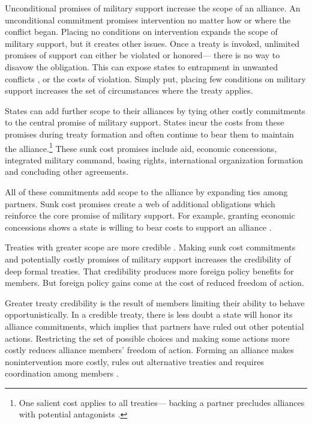 \documentclass[12pt]{article}
\begin{document}
Unconditional promises of military support increase the scope of an alliance. 
An unconditional commitment promises intervention no matter how or where the conflict began. 
Placing no conditions on intervention expands the scope of military support, but it creates other issues. 
Once a treaty is invoked, unlimited promises of support can either be violated or honored--- there is no way to disavow the obligation. 
This can expose states to entrapment in unwanted conflicts \citep{Snyder1990, Benson2012}, or the costs of violation. 
Simply put, placing few conditions on military support increases the set of circumstances where the treaty applies.  


States can add further scope to their alliances by tying other costly commitments to the central promise of military support. 
States incur the costs from these promises during treaty formation and often continue to bear them to maintain the alliance.\footnote{
One salient cost applies to all treaties--- backing a partner precludes alliances with potential antagonists \citep{Snyder1997}.} 
These sunk cost promises include aid, economic concessions, integrated military command, basing rights, international organization formation and concluding other agreements. 


All of these commitments add scope to the alliance by expanding ties among partners. 
Sunk cost promises create a web of additional obligations which reinforce the core promise of military support.  
For example, granting economic concessions shows a state is willing to bear costs to support an alliance \citep{WolfordKim2017}. 


Treaties with greater scope are more credible \citep{Poast2013}. 
Making sunk cost commitments and potentially costly promises of military support increases the credibility of deep formal treaties.
That credibility produces more foreign policy benefits for members. 
But foreign policy gains come at the cost of reduced freedom of action. 


Greater treaty credibility is the result of members limiting their ability to behave opportunistically. 
In a credible treaty, there is less doubt a state will honor its alliance commitments, which implies that partners have ruled out other potential actions. 
Restricting the set of possible choices and making some actions more costly reduces alliance members' freedom of action. 
Forming an alliance makes nonintervention more costly, rules out alternative treaties and requires coordination among members \citep{Snyder1997}. 
\end{document}
